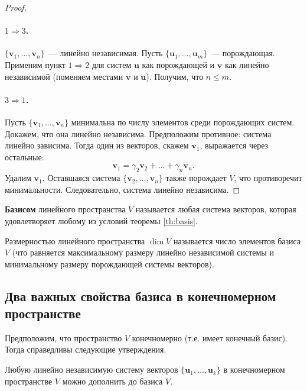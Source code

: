 \documentclass[10pt]{article}
\begin{document}
\begin{proof}
\paragraph{\(1 \Rightarrow 3\).}
\(\{\mathbf{v}_1,\dots,\mathbf{v}_n\}\)~--- линейно независимая. Пусть \(\{\mathbf{u}_1,\dots,\mathbf{u}_m\}\)~--- порождающая. Применим пункт \(1 \Rightarrow 2\) для систем $\mathbf{u}$ как порождающей и $\mathbf{v}$ как линейно независимой (поменяем местами $\mathbf{v}$ и $\mathbf{u}$). Получим, что $n \leq m$.

\paragraph{\(3 \Rightarrow 1\).}
Пусть \(\{\mathbf{v}_1,\dots,\mathbf{v}_n\}\) минимальна по числу элементов среди порождающих систем. Докажем, что она линейно независима. Предположим противное: система линейно зависима. Тогда один из векторов, скажем \(\mathbf{v}_1\), выражается через остальные:
\[
\mathbf{v}_1 = \gamma_2\mathbf{v}_2 + \dots + \gamma_n\mathbf{v}_n.
\]
Удалим \(\mathbf{v}_1\). Оставшаяся система \(\{\mathbf{v}_2,\dots,\mathbf{v}_n\}\) также порождает \(V\), что противоречит минимальности. Следовательно, система линейно независима.
\end{proof}

\begin{definition}[Базис]
\textbf{Базисом} линейного пространства \(V\) называется любая система векторов, которая удовлетворяет любому из условий теоремы \ref{th:basis}.

Размерностью линейного пространства $\dim V$ называется число элементов базиса $V$ (что равняется максимальному размеру линейно независимой системы и минимальному размеру порождающей системы векторов).
\end{definition}

\subsection*{Два важных свойства базиса в конечномерном пространстве}

Предположим, что пространство \(V\) конечномерно (т.е. имеет конечный базис). Тогда справедливы следующие утверждения.

\begin{theorem}
Любую линейно независимую систему векторов \(\{\mathbf{u}_1,\dots,\mathbf{u}_k\}\) в конечномерном пространстве \(V\) можно дополнить до базиса \(V\).
\end{theorem}
\end{document}
